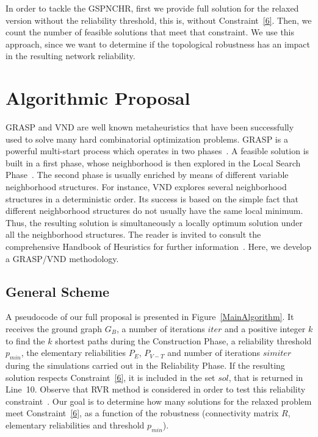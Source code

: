 \documentclass{llncs}
\begin{document}
In order to tackle the GSPNCHR, first we provide full solution for the relaxed version without the reliability threshold, 
this is, without Constraint~\ref{6}. Then, we count the number of feasible solutions that meet that constraint. We use this approach, since we want to determine if the topological robustness has an impact in the resulting network reliability. 


\section{Algorithmic Proposal}\label{solution}
GRASP and VND are well known metaheuristics that have been successfully used to solve many hard combinatorial optimization problems. GRASP is a powerful multi-start process which operates in two phases~\cite{51}. A feasible solution is built 
in a first phase, whose neighborhood is then explored in the Local Search Phase~\cite{51}. The second phase is usually enriched by means of different variable neighborhood structures. For instance, VND explores several neighborhood structures in a deterministic order. Its success is based on the simple fact that different neighborhood structures do not usually have the same local minimum. Thus,  the resulting solution is simultaneously a locally optimum solution under all the neighborhood structures. The reader is invited to consult the comprehensive Handbook of Heuristics for further information~\cite{50}. Here, we develop a GRASP/VND methodology.

\subsection{General Scheme}
A pseudocode of our full proposal is presented in Figure~\ref{MainAlgorithm}. 
It receives the ground graph $G_B$, a number of iterations $iter$ and a positive integer 
$k$ to find the $k$ shortest paths during the Construction Phase, a reliability threshold $p_{min}$, 
the elementary reliabilities $P_E$, $P_{V-T}$ and number of iterations $simiter$ during the simulations carried out in the Reliability Phase. If the resulting solution respects Constraint~\ref{6}, it is included 
in the set $sol$, that is returned in Line~10. Observe that RVR method is considered in order to test this reliability constraint~\cite{85}. Our goal is to determine how many solutions for the relaxed problem 
meet Constraint~\ref{6}, as a function of the robustness (connectivity matrix $R$, elementary reliabilities and threshold 
$p_{min}$). 
\end{document}
